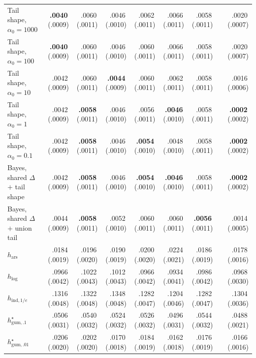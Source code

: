 \documentclass[11pt]{article}
\newcommand{\mcse}[2]{\mbox{#1\,{\fontsize{7}{8}\selectfont(#2)}}}
\newcommand{\bestmcse}[2]{\mbox{\textbf{#1}\,{\fontsize{7}{8}\selectfont(#2)}}}
\begin{document}
\begin{table}[p]
\begin{tabular}{@{}lrrrrrrcr@{}}
Tail shape, $\alpha_0=1000$ & \bestmcse{.0040}{.0009} & \mcse{.0060}{.0011} & \mcse{.0046}{.0010} & \mcse{.0062}{.0011} & \mcse{.0066}{.0011} & \mcse{.0058}{.0011} & & \mcse{.0020}{.0007} \\
Tail shape, $\alpha_0=100$ & \bestmcse{.0040}{.0009} & \mcse{.0060}{.0011} & \mcse{.0046}{.0010} & \mcse{.0060}{.0011} & \mcse{.0066}{.0011} & \mcse{.0058}{.0011} & & \mcse{.0020}{.0007} \\
Tail shape, $\alpha_0=10$ & \mcse{.0042}{.0009} & \mcse{.0060}{.0011} & \bestmcse{.0044}{.0009} & \mcse{.0060}{.0011} & \mcse{.0062}{.0011} & \mcse{.0058}{.0011} & & \mcse{.0016}{.0006} \\
Tail shape, $\alpha_0=1$ & \mcse{.0042}{.0009} & \bestmcse{.0058}{.0011} & \mcse{.0046}{.0010} & \mcse{.0056}{.0011} & \bestmcse{.0046}{.0010} & \mcse{.0058}{.0011} & & \bestmcse{.0002}{.0002} \\
Tail shape, $\alpha_0=0.1$ & \mcse{.0042}{.0009} & \bestmcse{.0058}{.0011} & \mcse{.0046}{.0010} & \bestmcse{.0054}{.0010} & \mcse{.0048}{.0010} & \mcse{.0058}{.0011} & & \bestmcse{.0002}{.0002} \\
Bayes, shared $\Delta$ $+$ tail shape & \mcse{.0042}{.0009} & \bestmcse{.0058}{.0011} & \mcse{.0046}{.0010} & \bestmcse{.0054}{.0010} & \bestmcse{.0046}{.0010} & \mcse{.0058}{.0011} & & \bestmcse{.0002}{.0002} \\
Bayes, shared $\Delta$ $+$ union tail & \mcse{.0044}{.0009} & \bestmcse{.0058}{.0011} & \mcse{.0052}{.0010} & \mcse{.0060}{.0011} & \mcse{.0060}{.0011} & \bestmcse{.0056}{.0011} & & \mcse{.0014}{.0005} \\
\addlinespace[1pt]
$h_{\mathrm{ars}}$ & \mcse{.0184}{.0019} & \mcse{.0196}{.0020} & \mcse{.0190}{.0019} & \mcse{.0200}{.0020} & \mcse{.0224}{.0021} & \mcse{.0186}{.0019} & & \mcse{.0178}{.0016} \\
$h_{\log}$ & \mcse{.0966}{.0042} & \mcse{.1022}{.0043} & \mcse{.1012}{.0043} & \mcse{.0966}{.0042} & \mcse{.0934}{.0041} & \mcse{.0986}{.0042} & & \mcse{.0968}{.0030} \\
$h_{\mathrm{ind},1/e}$ & \mcse{.1316}{.0048} & \mcse{.1322}{.0048} & \mcse{.1348}{.0048} & \mcse{.1282}{.0047} & \mcse{.1204}{.0046} & \mcse{.1282}{.0047} & & \mcse{.1304}{.0036} \\
$h^\star_{\mathrm{gum},.1}$ & \mcse{.0506}{.0031} & \mcse{.0540}{.0032} & \mcse{.0524}{.0032} & \mcse{.0526}{.0032} & \mcse{.0496}{.0031} & \mcse{.0544}{.0032} & & \mcse{.0488}{.0021} \\
$h^\star_{\mathrm{gum},.01}$ & \mcse{.0206}{.0020} & \mcse{.0202}{.0020} & \mcse{.0170}{.0018} & \mcse{.0184}{.0019} & \mcse{.0162}{.0018} & \mcse{.0176}{.0019} & & \mcse{.0166}{.0016} \\

\end{tabular}
\end{table}
\end{document}
